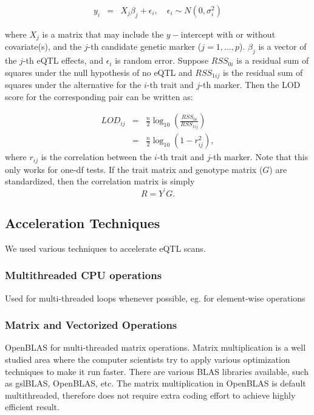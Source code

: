 \documentclass[9pt,twocolumn,twoside,lineno]{gsag3jnl}
\begin{document}
\begin{eqnarray*}
	y_i &=& X_j \beta_j+ \epsilon_i,
	\quad \epsilon_i \sim N(0,\sigma_i^2)
\end{eqnarray*}

where ${X}_j$ is a matrix that may include the $y-$intercept with
or without covariate(s), and the $j$-th candidate genetic marker
($j=1,\ldots,p$).  ${\beta}_j$ is a vector of the $j$-th eQTL
effects, and ${\epsilon}_i$ is random error.  Suppose $RSS_{0i}$
is a residual sum of squares under the null hypothesis of no eQTL
and $RSS_{1ij}$ is the residual sum of squares under the
alternative for the $i$-th trait and $j$-th marker.  Then the LOD
score for the corresponding pair can be written as:

\begin{eqnarray*}
	LOD_{ij} &=& \frac{n}{2} \log_{10} \left( \frac{RSS_{0i}}{RSS_{1ij}} \right)\\
	&=& \frac{n}{2} \log_{10} \left( 1{-}r_{ij}^2 \right),
\end{eqnarray*}
where $r_{ij}$ is the correlation between the $i$-th trait and
$j$-th marker. Note that this only works for one-df tests.  If the
trait matrix and genotype matrix ($G$) are standardized, then the
correlation matrix is simply $$R=Y^{'}G.$$

\subsection{Acceleration Techniques}
We used various techniques to accelerate eQTL scans. 
\subsubsection{Multithreaded CPU operations}
 Used for multi-threaded loops whenever possible, eg. for element-wise operations
\subsubsection{Matrix and Vectorized Operations}
 OpenBLAS for multi-threaded matrix operations. 
Matrix multiplication is a well studied area where the computer scientists try to apply various optimization techniques to make it run faster. 
There are various BLAS libraries available, such as gslBLAS, OpenBLAS, etc. 
The matrix multiplication in OpenBLAS is default multithreaded, therefore does not require extra coding effort to achieve highly efficient result. 
 
\end{document}
